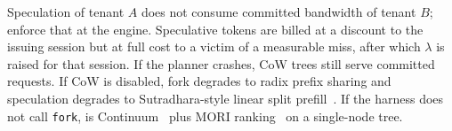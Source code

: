 Speculation of tenant $A$ does not consume committed bandwidth of tenant $B$;  enforce that at the engine.
Speculative tokens are billed at a discount to the issuing session but at full cost to a victim of a measurable \tbt{} miss, after which $\lambda$ is raised for that session.
If the planner crashes, CoW trees still serve committed requests.
If CoW is disabled, fork degrades to radix prefix sharing and speculation degrades to Sutradhara-style linear split prefill~\cite{sutradhara}.
If the harness does not call \texttt{fork}, \sys is Continuum~\cite{continuum} plus MORI ranking~\cite{mori} on a single-node tree.
